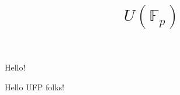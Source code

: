 \documentclass{amsart}
\title{$U(\mathbb{F}_p)$}
\begin{document}
    \maketitle

 Hello!

 Hello UFP folks!
\end{document}
